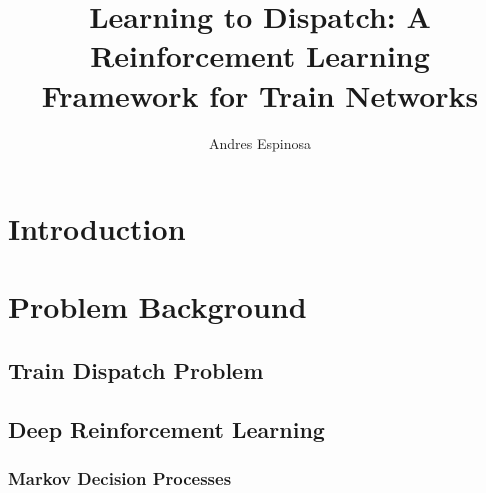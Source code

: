 \documentclass[runningheads]{llncs}
\begin{document}
\title{Learning to Dispatch: A Reinforcement Learning Framework for Train Networks}

\author{\textcolor{uf_blue}{Andres Espinosa}}
\maketitle


\begin{abstract}

\end{abstract}



\section{Introduction}
\label{sse:introduction}

\section{Problem Background}
\label{sse:background}
\subsection{Train Dispatch Problem}
\label{sss:train}
\subsection{Deep Reinforcement Learning}
\label{sss:reinforcement_learning}
\subsubsection{Markov Decision Processes}
\end{document}
